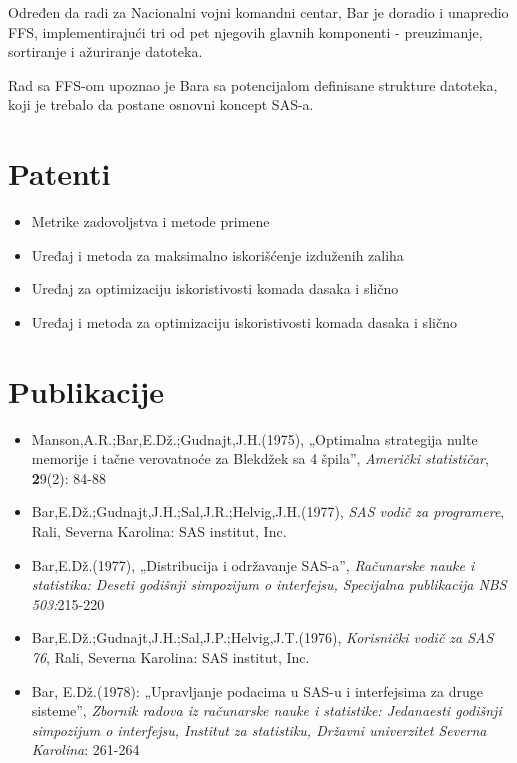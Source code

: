 \documentclass[a4paper]{article}
\begin{document}
{		Određen da radi za Nacionalni vojni komandni centar, Bar je doradio i unapredio FFS, implementirajući tri od pet njegovih glavnih komponenti - preuzimanje, sortiranje i ažuriranje datoteka.
		
		Rad sa FFS-om upoznao je Bara sa potencijalom definisane strukture datoteka, koji je trebalo da postane osnovni koncept SAS-a.
		
		\newpage	
		
		\section{Patenti}
		
		\begin{itemize}
			\item Metrike zadovoljstva i metode primene
			\item Uređaj i metoda za maksimalno iskorišćenje izduženih zaliha
			\item Uređaj za optimizaciju iskoristivosti komada dasaka i slično
			\item Uređaj i metoda za optimizaciju iskoristivosti komada dasaka i slično
		\end{itemize}
		
		\section{Publikacije}
		
		\begin{itemize}
			\item Manson,A.R.;Bar,E.Dž.;Gudnajt,J.H.(1975), „Optimalna strategija nulte memorije i tačne verovatnoće za Blekdžek sa 4 špila”, \textit{Američki statističar}, \textbf29(2): 84-88
			\item Bar,E.Dž.;Gudnajt,J.H.;Sal,J.R.;Helvig,J.H.(1977), \textit{SAS vodič za programere}, Rali, Severna Karolina: SAS institut, Inc.
			\item Bar,E.Dž.(1977), „Distribucija i održavanje SAS-a”, \textit{Računarske nauke i statistika: Deseti godišnji simpozijum o interfejsu, Specijalna publikacija NBS 503:}215-220
			\item Bar,E.Dž.;Gudnajt,J.H.;Sal,J.P.;Helvig,J.T.(1976), \textit{Korisnički vodič za SAS 76}, Rali, Severna Karolina: SAS institut, Inc.
			\item Bar, E.Dž.(1978): „Upravljanje podacima u SAS-u i interfejsima za druge sisteme”, \textit{Zbornik radova iz računarske nauke i statistike: Jedanaesti godišnji simpozijum o interfejsu, Institut za statistiku, Državni univerzitet Severna Karolina}: 261-264
		\end{itemize}
		
}
\end{document}
